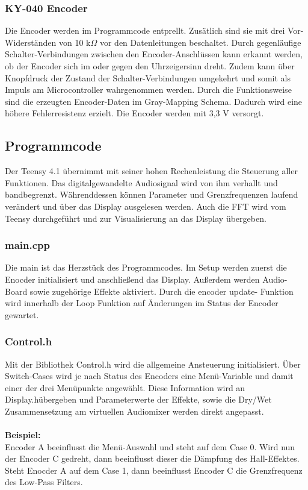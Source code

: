 \documentclass[12pt]{article}
\begin{document}
\subsubsection{KY-040 Encoder}
Die Encoder werden im Programmcode entprellt. Zusätlich sind sie mit drei Vor-Widerständen von 10 k$\Omega$ vor den Datenleitungen beschaltet.
Durch gegenläufige Schalter-Verbindungen zwischen den Encoder-Anschlüssen kann erkannt werden, ob der Encoder sich im oder gegen den Uhrzeigersinn dreht.
Zudem kann über Knopfdruck der Zustand der Schalter-Verbindungen umgekehrt und somit als Impuls am Microcontroller wahrgenommen werden.
Durch die Funktionsweise sind die erzeugten Encoder-Daten im Gray-Mapping Schema. Dadurch wird eine höhere Fehlerresistenz erzielt.
Die Encoder werden mit 3,3 V versorgt.

\subsection{Programmcode}
Der Teensy 4.1 übernimmt mit seiner hohen Rechenleistung die Steuerung aller Funktionen. 
Das digitalgewandelte Audiosignal wird von ihm verhallt und bandbegrenzt. 
Währenddessen können Parameter und Grenzfrequenzen laufend verändert und über das Display ausgelesen werden. 
Auch die FFT wird vom Teensy durchgeführt und zur Visualisierung an das Display übergeben.
\subsubsection{main.cpp}
Die main ist das Herzstück des Programmcodes. Im Setup werden zuerst die Enocder initialisiert und anschließend das Display. 
Außerdem werden Audio-Board sowie zugehörige Effekte aktiviert. 
Durch die \glq encoder update\grq{}\:- Funktion wird innerhalb der Loop Funktion auf Änderungen im Status der Encoder gewartet.
\subsubsection{Control.h}
Mit der Bibliothek \glq Control.h\grq{} wird die allgemeine Ansteuerung initialisiert. 
Über Switch-Cases wird je nach Status des Encoders eine Menü-Variable und damit einer der drei Menüpunkte angewählt. Diese Information wird an \glq Display.h\grq{}\:übergeben 
und Parameterwerte der Effekte, sowie die Dry/Wet Zusammensetzung am virtuellen Audiomixer werden direkt angepasst.
\\
\\
\textbf{Beispiel:}
\\
Encoder A beeinflusst die Menü-Auswahl und steht auf dem Case 0. Wird nun der Encoder C gedreht, dann beeinflusst dieser die Dämpfung des Hall-Effektes.
Steht Enocder A auf dem Case 1, dann beeinflusst Encoder C die Grenzfrequenz des Low-Pass Filters.
\end{document}
